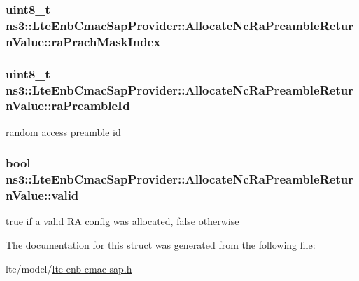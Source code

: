 \subsubsection[{\texorpdfstring{ra\+Prach\+Mask\+Index}{raPrachMaskIndex}}]{\setlength{\rightskip}{0pt plus 5cm}uint8\+\_\+t ns3\+::\+Lte\+Enb\+Cmac\+Sap\+Provider\+::\+Allocate\+Nc\+Ra\+Preamble\+Return\+Value\+::ra\+Prach\+Mask\+Index}\hypertarget{structns3_1_1LteEnbCmacSapProvider_1_1AllocateNcRaPreambleReturnValue_ad9a4a01c74376c8eea53c44571d009ba}{}\label{structns3_1_1LteEnbCmacSapProvider_1_1AllocateNcRaPreambleReturnValue_ad9a4a01c74376c8eea53c44571d009ba}
\subsubsection[{\texorpdfstring{ra\+Preamble\+Id}{raPreambleId}}]{\setlength{\rightskip}{0pt plus 5cm}uint8\+\_\+t ns3\+::\+Lte\+Enb\+Cmac\+Sap\+Provider\+::\+Allocate\+Nc\+Ra\+Preamble\+Return\+Value\+::ra\+Preamble\+Id}\hypertarget{structns3_1_1LteEnbCmacSapProvider_1_1AllocateNcRaPreambleReturnValue_a1a92ec4cf83011b7945942f64d274dd1}{}\label{structns3_1_1LteEnbCmacSapProvider_1_1AllocateNcRaPreambleReturnValue_a1a92ec4cf83011b7945942f64d274dd1}


random access preamble id 

\subsubsection[{\texorpdfstring{valid}{valid}}]{\setlength{\rightskip}{0pt plus 5cm}bool ns3\+::\+Lte\+Enb\+Cmac\+Sap\+Provider\+::\+Allocate\+Nc\+Ra\+Preamble\+Return\+Value\+::valid}\hypertarget{structns3_1_1LteEnbCmacSapProvider_1_1AllocateNcRaPreambleReturnValue_a9b118a8ef02ad3634f82fe9da62c0914}{}\label{structns3_1_1LteEnbCmacSapProvider_1_1AllocateNcRaPreambleReturnValue_a9b118a8ef02ad3634f82fe9da62c0914}


true if a valid RA config was allocated, false otherwise 



The documentation for this struct was generated from the following file\+:\begin{DoxyCompactItemize}
\item 
lte/model/\hyperlink{lte-enb-cmac-sap_8h}{lte-\/enb-\/cmac-\/sap.\+h}\end{DoxyCompactItemize}
